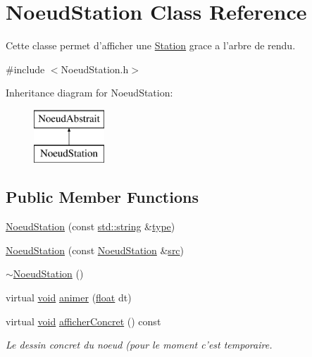 \hypertarget{class_noeud_station}{\section{Noeud\-Station Class Reference}
\label{class_noeud_station}
}


Cette classe permet d'afficher une \hyperlink{class_station}{Station} grace a l'arbre de rendu.  




{\ttfamily \#include $<$Noeud\-Station.\-h$>$}

Inheritance diagram for Noeud\-Station\-:\begin{figure}[H]
\begin{center}
\leavevmode
\includegraphics[height=2.000000cm]{class_noeud_station}
\end{center}
\end{figure}
\subsection*{Public Member Functions}
\begin{DoxyCompactItemize}
\item 
\hyperlink{class_noeud_station_aa5d82a821e4662d843f5d6a4575fa55c}{Noeud\-Station} (const \hyperlink{glew_8h_ae84541b4f3d8e1ea24ec0f466a8c568b}{std\-::string} \&\hyperlink{fmod_8h_a5338b9cb3874378d7e5adfbe80a8a381}{type})
\item 
\hyperlink{class_noeud_station_a2b47ef290b117b0ec9b585b61bfc9bbe}{Noeud\-Station} (const \hyperlink{class_noeud_station}{Noeud\-Station} \&\hyperlink{glew_8h_a72e0fdf0f845ded60b1fada9e9195cd7}{src})
\item 
\hyperlink{class_noeud_station_a8d3b3efc21e863912a2e336835e4abec}{$\sim$\-Noeud\-Station} ()
\item 
virtual \hyperlink{wglew_8h_aeea6e3dfae3acf232096f57d2d57f084}{void} \hyperlink{class_noeud_station_a91d4bb1205eccd2f1757fb2812542ad0}{animer} (\hyperlink{fmod_8h_aeb841aa4b4b5f444b5d739d865b420af}{float} dt)
\item 
virtual \hyperlink{wglew_8h_aeea6e3dfae3acf232096f57d2d57f084}{void} \hyperlink{class_noeud_station_aa196ba98d1d45483745e2ffe2659f92d}{afficher\-Concret} () const 
\begin{DoxyCompactList}\small\item\em Le dessin concret du noeud (pour le moment c'est temporaire. \end{DoxyCompactList}\end{DoxyCompactItemize}
